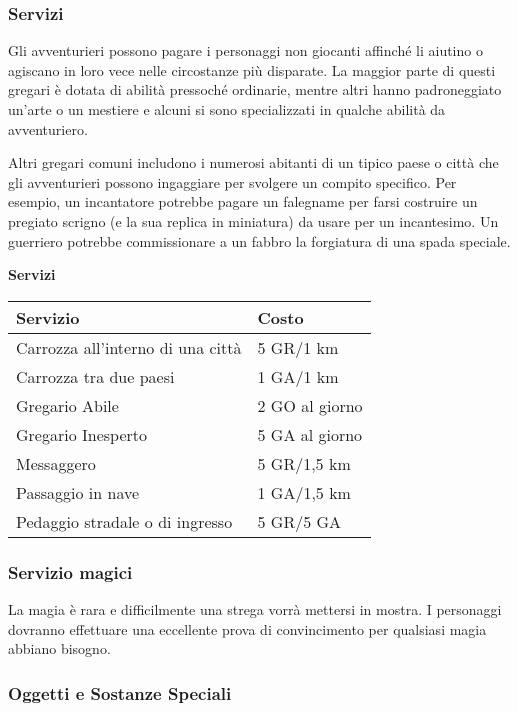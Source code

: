\documentclass[12pt,a4paper,twoside,openany]{book}
\begin{document}
\begin{multicols}{2}


\subsubsection{Servizi}

Gli avventurieri possono pagare i personaggi non giocanti affinché li aiutino o agiscano in loro vece nelle circostanze più disparate. La maggior parte di questi gregari è dotata di abilità pressoché ordinarie, mentre altri hanno padroneggiato un'arte o un mestiere e alcuni si sono specializzati in qualche abilità da avventuriero.

Altri gregari comuni includono i numerosi abitanti di un tipico paese o città che gli avventurieri possono ingaggiare per svolgere un compito specifico. Per esempio, un incantatore potrebbe pagare un falegname per farsi costruire un pregiato scrigno (e la sua replica in miniatura) da usare per un incantesimo.
Un guerriero potrebbe commissionare a un fabbro la forgiatura di una spada speciale.

\medskip

\textbf{Servizi}

\bigskip

\begin{tabularx}{0.45\textwidth}{Xl}
\textbf{Servizio}&\textbf{Costo}\\
\toprule
Carrozza all'interno di una città&5 GR/1 km\\
Carrozza tra due paesi&1 GA/1 km\\
Gregario Abile&2 GO al giorno\\
Gregario Inesperto&5 GA al giorno\\
Messaggero&5 GR/1,5 km\\
Passaggio in nave&1 GA/1,5 km\\
Pedaggio stradale o di ingresso&5 GR/5 GA\\
\end{tabularx}


\subsubsection{Servizio magici}


La magia è rara e difficilmente una strega vorrà mettersi in mostra.
I personaggi dovranno effettuare una eccellente prova di convincimento per qualsiasi magia abbiano bisogno.

\subsubsection{Oggetti e Sostanze Speciali}


\end{multicols}
\end{document}
